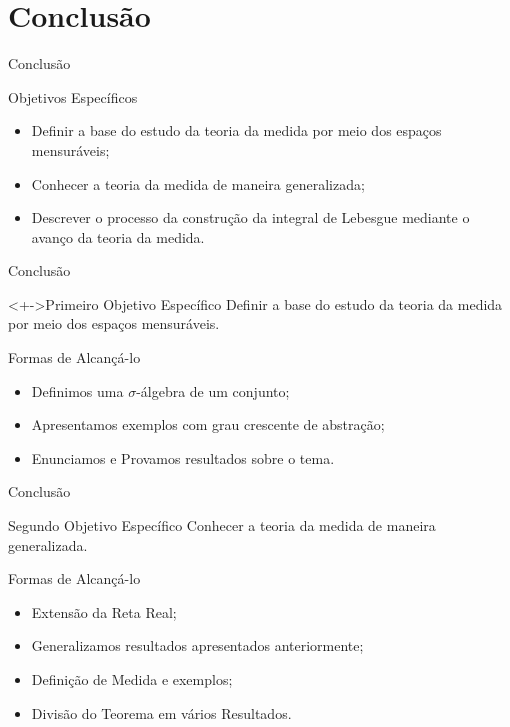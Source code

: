 \AtBeginSection[]{
	\begin{frame}
		\frametitle{}
		\tableofcontents[currentsection]
	\end{frame}
}

\section{Conclusão}
	\begin{frame}{Conclusão}
		\begin{block}{Objetivos Específicos}
			\begin{itemize}[<+->]
				\item Definir a base do estudo da teoria da medida por meio dos espaços mensuráveis;
				\item Conhecer a teoria da medida de maneira generalizada;
				\item Descrever o processo da construção da integral de Lebesgue mediante o avanço da teoria da medida.
			\end{itemize}
		\end{block}
	\end{frame}

	\begin{frame}{Conclusão}
		\begin{block}<+->{Primeiro Objetivo Específico}
			\justify Definir a base do estudo da teoria da medida por meio dos espaços mensuráveis.
		\end{block}
		\begin{block}{Formas de Alcançá-lo}
			\begin{itemize}[<+->]
				\item Definimos uma $\sigma$-álgebra de um conjunto;
				\item Apresentamos exemplos com grau crescente de abstração;
				\item Enunciamos e Provamos resultados sobre o tema.
			\end{itemize}
		\end{block}
	\end{frame}

	\begin{frame}{Conclusão}
		\begin{block}{Segundo Objetivo Específico}
			 Conhecer a teoria da medida de maneira generalizada.
		\end{block}
	\begin{block}{Formas de Alcançá-lo}
		\begin{itemize}[<+->]
				\item Extensão da Reta Real;
				\item Generalizamos resultados apresentados anteriormente;
				\item Definição de Medida e exemplos;
				\item Divisão do Teorema em vários Resultados.
			\end{itemize}
		\end{block}
	\end{frame}


